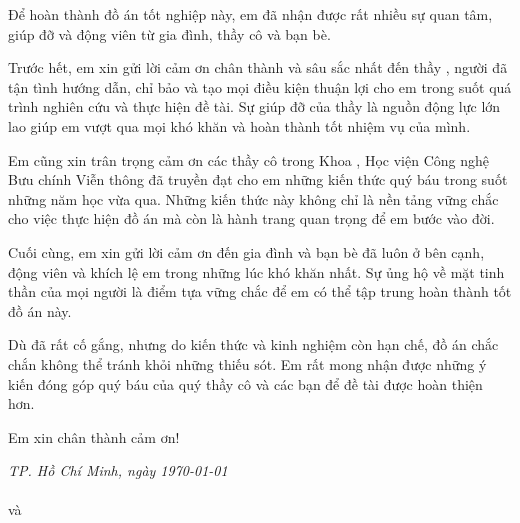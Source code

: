 \begin{acknowledgments}
\setlength{\parskip}{6pt}
Để hoàn thành đồ án tốt nghiệp này, em đã nhận được rất nhiều sự quan tâm, giúp đỡ và động viên từ gia đình, thầy cô và bạn bè.

Trước hết, em xin gửi lời cảm ơn chân thành và sâu sắc nhất đến thầy \textbf{\supervisor}, người đã tận tình hướng dẫn, chỉ bảo và tạo mọi điều kiện thuận lợi cho em trong suốt quá trình nghiên cứu và thực hiện đề tài. Sự giúp đỡ của thầy là nguồn động lực lớn lao giúp em vượt qua mọi khó khăn và hoàn thành tốt nhiệm vụ của mình.

Em cũng xin trân trọng cảm ơn các thầy cô trong Khoa \faculty, Học viện Công nghệ Bưu chính Viễn thông đã truyền đạt cho em những kiến thức quý báu trong suốt những năm học vừa qua. Những kiến thức này không chỉ là nền tảng vững chắc cho việc thực hiện đồ án mà còn là hành trang quan trọng để em bước vào đời.

Cuối cùng, em xin gửi lời cảm ơn đến gia đình và bạn bè đã luôn ở bên cạnh, động viên và khích lệ em trong những lúc khó khăn nhất. Sự ủng hộ về mặt tinh thần của mọi người là điểm tựa vững chắc để em có thể tập trung hoàn thành tốt đồ án này.

Dù đã rất cố gắng, nhưng do kiến thức và kinh nghiệm còn hạn chế, đồ án chắc chắn không thể tránh khỏi những thiếu sót. Em rất mong nhận được những ý kiến đóng góp quý báu của quý thầy cô và các bạn để đề tài được hoàn thiện hơn.

Em xin chân thành cảm ơn!

\vspace{2cm}
\begin{flushright}
    \textit{TP. Hồ Chí Minh, ngày \today} \\
     \\[2.5cm]

    \textbf{\studentname} và \textbf{\studentnametwo}\\
\end{flushright}
\end{acknowledgments}
